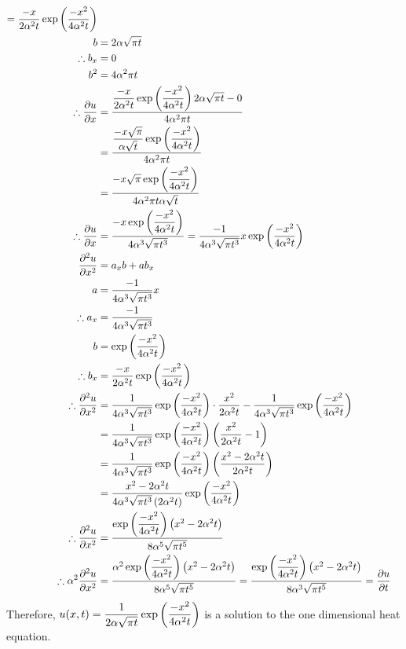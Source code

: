 \documentclass[a4paper, 11pt]{report}
\begin{document}
\begin{align*}
    	= \frac{-x}{2\alpha^2 t} \exp\left( \frac{-x^2}{4\alpha^2 t} \right) \\
   b &= 2\alpha\sqrt{\pi t} \\
   \therefore b_x &= 0 \\
   b^2 &= 4\alpha^2\pi t \\
   \therefore\frac{\partial u}{\partial x} &= \frac{\dfrac{-x}{2\alpha^2 t} \exp\left( \dfrac{-x^2}{4\alpha^2 t} \right)2\alpha\sqrt{\pi t} - 0}{4\alpha^2\pi t} \\
     &= \frac{\dfrac{-x\sqrt{\pi}}{\alpha \sqrt{t}} \exp\left( \dfrac{-x^2}{4\alpha^2 t} \right)}{4\alpha^2\pi t} \\
     &= \frac{-x\sqrt{\pi} \exp\left( \dfrac{-x^2}{4\alpha^2 t} \right)}{4\alpha^2\pi t \alpha \sqrt{t}} \\
   \therefore\frac{\partial u}{\partial x} &= \frac{-x \exp\left( \dfrac{-x^2}{4\alpha^2 t} \right)}{4\alpha^3 \sqrt{\pi t^3}}
    	= \frac{-1}{4\alpha^3 \sqrt{\pi t^3}} x \exp\left( \dfrac{-x^2}{4\alpha^2 t} \right) \\ 
   \frac{\partial ^2 u}{\partial x^2} &= a_xb + ab_x \\
   a &= \frac{-1}{4\alpha^3 \sqrt{\pi t^3}} x \\
   \therefore a_x &= \frac{-1}{4\alpha^3 \sqrt{\pi t^3}} \\
   b &= \exp\left( \dfrac{-x^2}{4\alpha^2 t} \right) \\
   \therefore b_x &= \frac{-x}{2\alpha^2 t} \exp\left( \frac{-x^2}{4\alpha^2 t} \right) \\
   \therefore\frac{\partial ^2 u}{\partial x^2} &= \frac{1}{4\alpha^3 \sqrt{\pi t^3}} \exp\left( \frac{-x^2}{4\alpha^2 t} \right) \cdot \frac{x^2}{2\alpha^2 t} - \frac{1}{4\alpha^3 \sqrt{\pi t^3}}\exp\left( \dfrac{-x^2}{4\alpha^2 t} \right) \\  
     &= \frac{1}{4\alpha^3 \sqrt{\pi t^3}} \exp\left( \frac{-x^2}{4\alpha^2 t} \right) \left( \frac{x^2}{2\alpha^2 t} - 1 \right) \\  
     &= \frac{1}{4\alpha^3 \sqrt{\pi t^3}} \exp\left( \frac{-x^2}{4\alpha^2 t} \right) \left( \frac{x^2 - 2\alpha^2 t}{2\alpha^2 t} \right) \\
     &= \frac{x^2 - 2\alpha^2 t}{4\alpha^3 \sqrt{\pi t^3}\left( 2\alpha^2 t \right)} \exp\left( \frac{-x^2}{4\alpha^2 t} \right) \\
   \therefore\frac{\partial ^2 u}{\partial x^2} &= \frac{\exp\left( \dfrac{-x^2}{4\alpha^2 t} \right)\left( x^2 - 2\alpha^2 t \right)}{8\alpha^5 \sqrt{\pi t^5}} \\
   \therefore\alpha^2\frac{\partial ^2 u}{\partial x^2} &= \frac{\alpha^2 \exp\left( \dfrac{-x^2}{4\alpha^2 t} \right)\left( x^2 - 2\alpha^2 t \right)}{8\alpha^5 \sqrt{\pi t^5}} 
    	= \frac{\exp\left( \dfrac{-x^2}{4\alpha^2 t} \right)\left( x^2 - 2\alpha^2 t \right)}{8\alpha^3 \sqrt{\pi t^5}} 
    	= \frac{\partial u}{\partial t}
\end{align*}
Therefore, $u(x,t) = \dfrac{1}{2\alpha\sqrt{\pi t}}\exp\left( \dfrac{-x^2}{4\alpha^2 t} \right)$ is a solution to the one dimensional heat equation.
\end{document}
